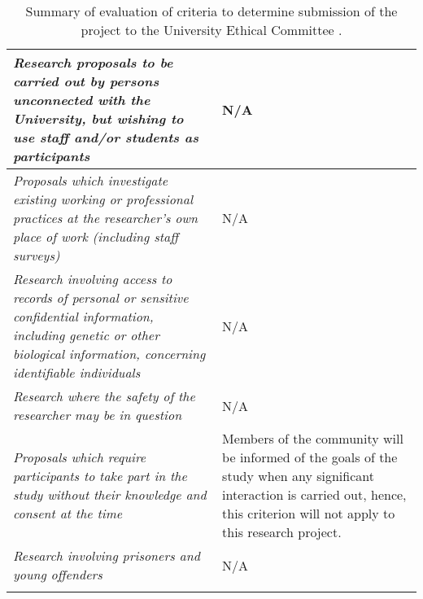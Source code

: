 \begin{longtable}{|p{10cm}|p{4cm}|}
\textsl{Research proposals to be carried out by persons unconnected with the University, but wishing to use staff and\slash or students as participants}                                                                    & N/A        \\ \hline
\textsl{Proposals which investigate existing working or professional practices at the researcher’s own place of work (including staff surveys)}                                                                            & N/A        \\ \hline
\textsl{Research involving access to records of personal or sensitive confidential information, including genetic or other biological information, concerning identifiable individuals}& N/A        \\ \hline
\textsl{Research where the safety of the researcher may be in question}                                                                                                                                                     & N/A        \\ \hline
\textsl{Proposals which require participants to take part in the study without their knowledge and consent at the time}                                                                                                     & Members of the community will be informed of the goals of the study when any significant interaction is carried out, hence, this criterion will not apply to this research project.        \\ \hline
\textsl{Research involving prisoners and young offenders}                                                                                                                                                                   & N/A        \\ \hline
\caption[Evaluation to determine submission to the University Ethical Committee]{Summary of evaluation of criteria to determine submission of the project to the University Ethical Committee \parencite[4-5]{UEC2013}.}
\label{tab:ethical}
\end{longtable}